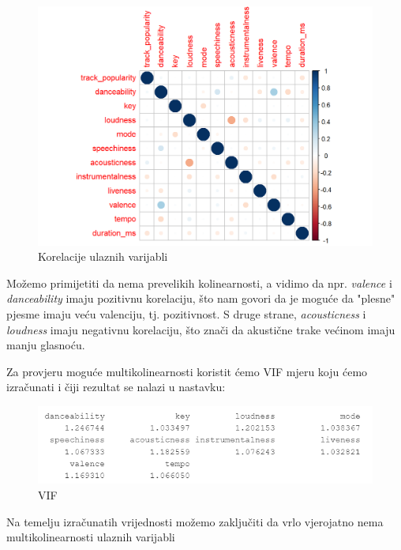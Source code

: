 	\begin{figure}[H]
		\includegraphics[scale=0.9]{slike/corrplot.png}
		\centering
		\caption{Korelacije ulaznih varijabli}
		
	\end{figure}
	
	Možemo primijetiti da nema prevelikih kolinearnosti, a vidimo da npr. \textit{valence} i \textit{danceability} imaju  pozitivnu korelaciju, što nam govori da je moguće da "plesne" pjesme imaju veću valenciju, tj. pozitivnost.
	S druge strane, \textit{acousticness} i \textit{loudness} imaju negativnu korelaciju, što znači da akustične trake većinom imaju manju glasnoću.
	
	Za provjeru moguće multikolinearnosti koristit ćemo VIF mjeru koju ćemo izračunati i čiji rezultat se nalazi u nastavku:
	
	\begin{figure}[H]
		\includegraphics[scale=0.9]{slike/vif.png}
		\centering
		\caption{VIF}
		
	\end{figure}
	
	Na temelju izračunatih vrijednosti možemo zaključiti da vrlo vjerojatno nema multikolinearnosti ulaznih varijabli
	
